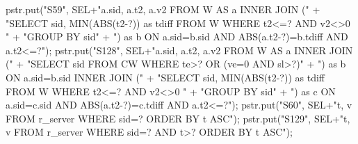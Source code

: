 \documentclass{article}
\def\nwendcode{\endtrivlist \endgroup}      %
\theoremstyle{definition}                   %
\begin{document}
pstr.put("S59", SEL+"a.sid, a.t2, a.v2 FROM W AS a INNER JOIN ("
      + "SELECT sid, MIN(ABS(t2-?)) as tdiff FROM W WHERE t2<=? AND v2<>0 "
      + "GROUP BY sid"
      + ") as b ON a.sid=b.sid AND ABS(a.t2-?)=b.tdiff AND a.t2<=?");
\eatline
{}\nwendcode{}\endmoddef{}
pstr.put("S128", SEL+"a.sid, a.t2, a.v2 FROM W AS a INNER JOIN ("
      + "SELECT sid FROM CW WHERE te>? OR (ve=0 AND sl>?)"
      + ") as b ON a.sid=b.sid INNER JOIN ("
      + "SELECT sid, MIN(ABS(t2-?)) as tdiff FROM W WHERE t2<=? AND v2<>0 "
      + "GROUP BY sid"
      + ") as c ON a.sid=c.sid AND ABS(a.t2-?)=c.tdiff AND a.t2<=?");
\eatline
{}\nwendcode{}\endmoddef{}
pstr.put("S60", SEL+"t, v FROM r_server WHERE sid=? ORDER BY t ASC");
\eatline
{}\nwendcode{}\endmoddef{}
pstr.put("S129", SEL+"t, v FROM r_server WHERE sid=? AND t>? ORDER BY t ASC");
\eatline
{}\nwendcode{}\endmoddef{}
\end{document}
